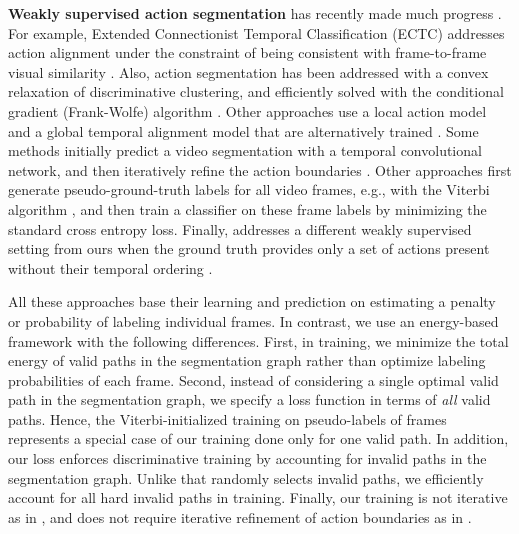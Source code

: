 \documentclass[10pt,twocolumn,letterpaper]{article}
\begin{document}
{\bf Weakly supervised action segmentation} has recently made much progress \cite{stein2013combining, kuehne2014language, richard2017weakly, ding2018weakly, richard2018neuralnetwork}.  For example, Extended Connectionist Temporal Classification (ECTC) addresses action alignment under the constraint of being consistent with frame-to-frame visual similarity \cite{huang2016connectionist}. Also,  action segmentation has been addressed with a convex relaxation of discriminative clustering, and efficiently solved with the conditional gradient (Frank-Wolfe) algorithm  \cite{bojanowski2014weakly}. Other approaches use a local action model and a global temporal alignment model that are alternatively trained  \cite{richard2017weaklysupervised, richard2017weakly}. Some methods initially predict a video segmentation with a temporal convolutional network, and then iteratively refine the action boundaries \cite{ding2018weakly}. Other approaches first  generate pseudo-ground-truth labels for all video frames, e.g., with the Viterbi algorithm \cite{richard2018neuralnetwork}, and then train a classifier on these frame labels by minimizing the standard cross entropy loss. Finally, \cite{richard2018actionsets} addresses a different weakly supervised setting from ours when the ground truth provides only a set of actions present without their temporal ordering .

All these approaches base their learning and prediction on estimating a penalty or probability of labeling individual frames. In contrast, we use an energy-based framework with the following differences. First, in training, we minimize the total energy of valid paths in the segmentation graph rather than optimize labeling probabilities of each frame. Second, instead of considering a single optimal valid path in the segmentation graph, we specify a loss function in terms of {\em all} valid paths. Hence, the Viterbi-initialized training on pseudo-labels of frames \cite{richard2018neuralnetwork} represents a special case of our training done only for one valid path. In addition, our loss enforces discriminative training by accounting for invalid paths in the segmentation graph. Unlike \cite{chang2019d3tw} that randomly selects invalid paths, we efficiently account for all hard invalid paths in training.
Finally, our training is not iterative as in \cite{richard2017weaklysupervised, richard2017weakly}, and does not require iterative refinement of action boundaries as in \cite{ding2018weakly}. 
\end{document}
